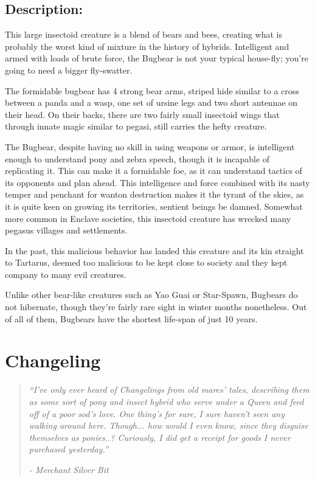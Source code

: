 \documentclass[11pt,a4paper,twocolumn]{book}
\begin{document}
	\subsection*{Description:}
	This large insectoid creature is a blend of bears and bees, creating what is probably the worst kind of mixture in the history of hybrids. Intelligent and armed with loads of brute force, the Bugbear is not your typical house-fly; you're going to need a bigger fly-swatter. 
	
	The formidable bugbear has 4 strong bear arms, striped hide similar to a cross between a panda and a wasp, one set of ursine legs and two short antennae on their head. On their backs, there are two fairly small insectoid wings that through innate magic similar to pegasi, still carries the hefty creature.
	
	The Bugbear, despite having no skill in using weapons or armor, is intelligent enough to understand pony and zebra speech, though it is incapable of replicating it. This can make it a formidable foe, as it can understand tactics of its opponents and plan ahead. This intelligence and force combined with its nasty temper and penchant for wanton destruction makes it the tyrant of the skies, as it is quite keen on growing its territories, sentient beings be damned. Somewhat more common in Enclave societies, this insectoid creature has wrecked many pegasus villages and settlements.
	
	\bigskip
	In the past, this malicious behavior has landed this creature and its kin straight to Tartarus, deemed too malicious to be kept close to society and they kept company to many evil creatures.
	
	Unlike other bear-like creatures such as Yao Guai or Star-Spawn, Bugbears do not hibernate, though they're fairly rare sight in winter months nonetheless. Out of all of them, Bugbears have the shortest life-span of just 10 years.	
	\clearpage
	
	\section*{Changeling}
	\begin{quote}
		\emph{``I've only ever heard of Changelings from old mares' tales, describing them as some sort of pony and insect hybrid who serve under a Queen and feed off of a poor sod's love. One thing's for sure, I sure haven't seen any walking around here. Though... how would I even know, since they disguise themselves as ponies..? Curiously, I did get a receipt for goods I never purchased yesterday.''}
		
		\emph{-	Merchant Silver Bit}
	\end{quote}
	
\end{document}
